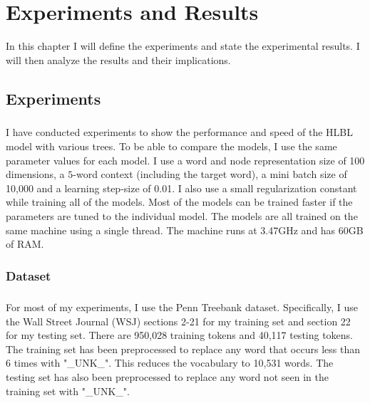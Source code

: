 \chapter{Experiments and Results}
In this chapter I will define the experiments and state the experimental results. I will then analyze the results and their implications.

\section{Experiments} \label{sec:experiments}
\paragraph{}
I have conducted experiments to show the performance and speed of the HLBL model with various trees. To be able to compare the models, I use the same parameter values for each model. I use a word and node representation size of 100 dimensions, a $5$-word context (including the target word), a mini batch size of 10,000 and a learning step-size of 0.01. I also use a small regularization constant while training all of the models. Most of the models can be trained faster if the parameters are tuned to the individual model. The models are all trained on the same machine using a single thread. The machine runs at 3.47GHz and has 60GB of RAM.

\subsection{Dataset}
\paragraph{}
For most of my experiments, I use the Penn Treebank dataset. Specifically, I use the Wall Street Journal (WSJ) sections 2-21 for my training set and section 22 for my testing set. There are 950,028 training tokens and 40,117 testing tokens. The training set has been preprocessed to replace any word that occurs less than 6 times with "\_UNK\_". This reduces the vocabulary to 10,531 words. The testing set has also been preprocessed to replace any word not seen in the training set with "\_UNK\_".



